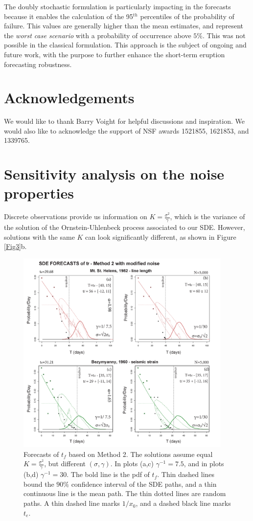 \documentclass{article}
\begin{document}
The doubly stochastic formulation is particularly impacting in the forecasts because it enables the calculation of the 95$^{th}$ percentiles of the probability of failure. This values are generally higher than the mean estimates, and represent the \emph{worst case scenario} with a probability of occurrence above $5\%$. This was not possible in the classical formulation. This approach is the subject of ongoing and future work, with the purpose to further enhance the short-term eruption forecasting robustness.

\section*{Acknowledgements}
We would like to thank Barry Voight for helpful discussions and inspiration. We would also like to acknowledge the support of NSF awards 1521855, 1621853, and 1339765.

\appendix
\section{Sensitivity analysis on the noise properties}\label{A-2}
Discrete observations provide us information on $K=\frac{\sigma^2}{\gamma}$, which is the variance of the solution of the Ornstein-Uhlenbeck process associated to our SDE. However, solutions with the same $K$ can look significantly different, as shown in Figure \ref{Fig3}b.

\begin{figure}[H]
\centering
\includegraphics[width=0.95\textwidth]{Fig12_plus.png}
\caption{Forecasts of $t_f$ based on Method 2. The solutions assume equal $K=\frac{\sigma^2}{\gamma}$, but different $(\sigma, \gamma)$. In plots (a,c) $\gamma^{-1}=7.5$, and in plots (b,d) $\gamma^{-1}=30$. The bold line is the pdf of $t_f$. Thin dashed lines bound the $90\%$ confidence interval of the SDE paths, and a thin continuous line is the mean path. The thin dotted lines are random paths. A thin dashed line marks $1/x_0$, and a dashed black line marks $t_e$.}
\label{Fig12}
\end{figure}
\end{document}
